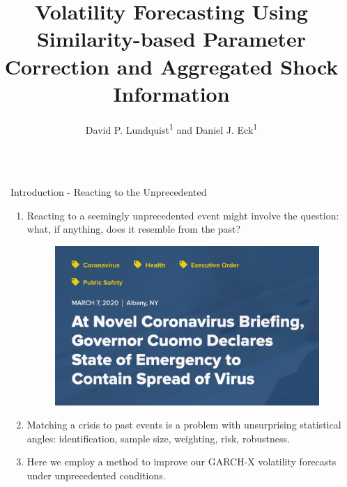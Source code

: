 \documentclass{beamer} %
\title{\LARGE Volatility Forecasting Using Similarity-based Parameter Correction and Aggregated Shock Information} %
\author{David P. Lundquist\textsuperscript{1} and Daniel J. Eck\textsuperscript{1}} %
\institute{\textsuperscript{1}Department of Statistics, University of Illinois Urbana-Champaign} %
\begin{document}
\begin{frame}[t] %

\begin{columns}[t] %

\begin{column}{0.02\textwidth}\end{column} %

\begin{column}{0.465\textwidth} %


\begin{block}{Introduction - Reacting to the Unprecedented}
	\begin{enumerate}
		\item Reacting to a seemingly unprecedented event might involve the question: what, if anything, does it resemble from the past? 
		\begin{figure}
			\includegraphics[scale = .6]{../NYS_state.png}
		\end{figure} 
		\item Matching a crisis to past events is a problem with unsurprising statistical angles: identification, sample size, weighting, risk, robustness.
		\item Here we employ a method to improve our GARCH-X volatility forecasts under unprecedented conditions.
	\end{enumerate}



\end{block}
\end{column}
\end{columns}
\end{frame}
\end{document}
